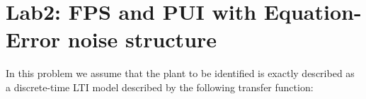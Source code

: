 \chapter[L2: PUI with EE noise structure]{Lab2: FPS and PUI with Equation-Error noise structure}

In this problem we assume that the plant to be identified is exactly described as a discrete-time LTI model described by the following transfer function: